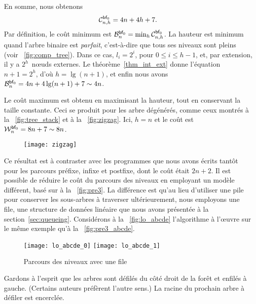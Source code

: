 En somme, nous obtenons
\begin{equation*}
\C{\fun{bf}_0}{n,h} = 4n + 4h + 7. \index{bf0@$\C{\fun{bf}_0}{n,h}$}
\end{equation*}
Par définition, le coût minimum est \(\B{\fun{bf}_0}{n} =
\min_h\C{\fun{bf}_0}{n,h}\). La hauteur
est minimum quand l'arbre binaire est \emph{parfait}, c'est-à-dire que tous ses niveaux sont
pleins (voir \fig~\vref{fig:comp_tree}). Dans ce cas, \(l_i=2^i\),
pour \(0 \leqslant i \leqslant h-1\), et, par extension, il y a
\(2^h\)~n{\oe}uds externes. Le théorème~\ref{thm_int_ext} donne
l'équation \(n+1 = 2^h\), d'où \(h=\lg(n+1)\), et enfin nous avons
\(\B{\fun{bf}_0}{n} = 4n + 4\lg(n+1) + 7 \sim
4n\). 

Le coût maximum est obtenu en maximisant la hauteur, tout en conservant la taille constante. Ceci se
produit pour les arbre dégénérés,
comme ceux montrés à la \fig~\vref{fig:tree_stack} et à la
\fig~\vref{fig:zigzag}. Ici, \(h=n\) et le coût est
\(\W{\fun{bf}_0}{n} = 8n + 7 \sim
8n\). 

%
\begin{wrapfigure}[7]{r}[0pt]{0pt}
\centering
\texttt{[image: zigzag]}
\caption{\label{fig:zigzag}}
\end{wrapfigure}
Ce résultat est à contraster avec les programmes que nous avons écrits
tantôt pour les parcours préfixe, infixe et postfixe, dont le coût
était \(2n+2\). Il est possible de réduire le coût du parcours des
niveaux en employant un modèle différent, basé sur
 à la
\fig~\vref{fig:pre3}. La différence est qu'au lieu d'utiliser une pile
pour conserver les sous-arbres à traverser ultérieurement, nous
employons une file, une structure de données linéaire que
nous avons présentée à la section~\ref{sec:queueing}. Considérons à la
\fig~\vref{fig:lo_abcde} l'algorithme à l'{\oe}uvre sur le même
exemple qu'à la \fig~\vref{fig:pre3_abcde}.
\begin{figure}[b]
\centering
\texttt{[image: lo\_abcde\_0]}
\bigskip
\texttt{[image: lo\_abcde\_1]}
\caption{Parcours des niveaux avec une file\label{fig:lo_abcde}}
\end{figure}
Gardons à l'esprit que les arbres sont défilés du côté droit de la
forêt et enfilés à gauche. (Certains auteurs préfèrent l'autre sens.)
La racine du prochain arbre à défiler est encerclée.

